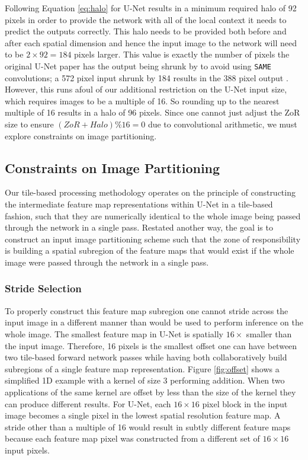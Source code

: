 \documentclass[10pt, indentfirst]{article}
\begin{document}
Following Equation \ref{eq:halo} for U-Net results in a minimum required halo of 92 pixels in order to provide the network with all of the local context it needs to predict the outputs correctly.
This halo needs to be provided both before and after each spatial dimension and hence the input image to the network will need to be $2 \times 92 = 184$ pixels larger.
This value is exactly the number of pixels the original U-Net paper has the output being shrunk by to avoid using \texttt{SAME} convolutions; a 572 pixel input shrunk by 184 results in the 388 pixel output \citep{Ronneberger2015a}.
However, this runs afoul of our additional restriction on the U-Net input size, which requires images to be a multiple of 16.
So rounding up to the nearest multiple of 16 results in a halo of 96 pixels.
Since  one cannot just adjust the ZoR size to ensure $(ZoR + Halo) \% 16 = 0$ due to convolutional arithmetic, we must explore constraints on image partitioning.

\subsection{Constraints on Image Partitioning}

Our tile-based processing methodology operates on the principle of constructing the intermediate feature map representations within U-Net in a tile-based fashion, such that they are numerically identical to the whole image being passed through the network in a single pass.
Restated another way, the goal is to construct an input image partitioning scheme such that the zone of responsibility is building a spatial subregion of the feature maps that would exist if the whole image were passed through the network in a single pass.

\subsubsection{Stride Selection}
To properly construct this feature map subregion one cannot stride across the input image in a different manner than would be used to perform inference on the whole image.
The smallest feature map in U-Net is spatially $16 \times$ smaller than the input image.
Therefore, 16 pixels is the smallest offset one can have between two tile-based forward network passes while having both collaboratively build subregions of a single feature map representation.
Figure \ref{fig:offset} shows a simplified 1D example with a kernel of size 3 performing addition.
When two applications of the same kernel are offset by less than the size of the kernel they can produce different results.
For U-Net, each $16 \times 16$ pixel block in the input image becomes a single pixel in the lowest spatial resolution feature map.
A stride other than a multiple of 16 would result in subtly different feature maps because each feature map pixel was constructed from a different set of $16 \times 16$ input pixels.
\end{document}

